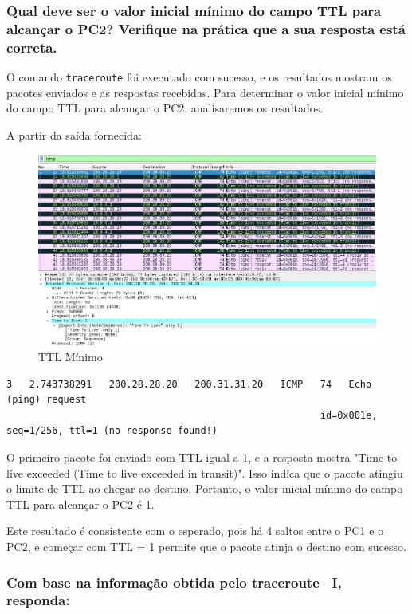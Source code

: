 \documentclass{article}
\begin{document}
\subsubsection{Qual deve ser o valor inicial mínimo do campo TTL para alcançar o PC2? Verifique na prática que a sua resposta está correta.}

O comando \texttt{traceroute} foi executado com sucesso, e os resultados mostram os pacotes enviados e as respostas recebidas. Para determinar o valor inicial mínimo do campo TTL para alcançar o PC2, analisaremos os resultados.

A partir da saída fornecida:

\begin{figure}[h]
    \centering
    \includegraphics[width=0.8\linewidth]{images/ttlminnice.png}
    \caption{TTL Mínimo}
    \label{fig:enter-label}
\end{figure}

\begin{verbatim}
3   2.743738291   200.28.28.20   200.31.31.20   ICMP   74   Echo (ping) request
                                                       id=0x001e, seq=1/256, ttl=1 (no response found!)
\end{verbatim}

O primeiro pacote foi enviado com TTL igual a 1, e a resposta mostra "Time-to-live exceeded (Time to live exceeded in transit)". Isso indica que o pacote atingiu o limite de TTL ao chegar ao destino. Portanto, o valor inicial mínimo do campo TTL para alcançar o PC2 é 1.

Este resultado é consistente com o esperado, pois há 4 saltos entre o PC1 e o PC2, e começar com TTL = 1 permite que o pacote atinja o destino com sucesso.


\subsubsection{Com base na informação obtida pelo traceroute –I, responda:}
\end{document}

